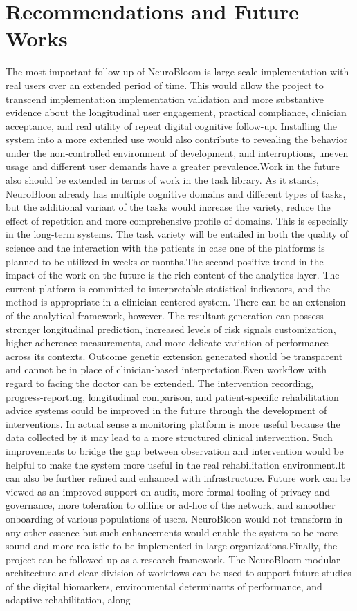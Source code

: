 \documentclass[12pt,a4paper]{report}
\begin{document}
\section{Recommendations and Future Works}
The most important follow up of NeuroBloom is large scale implementation with real users over an extended period of time. This would allow the project to transcend implementation implementation validation and more substantive evidence about the longitudinal user engagement, practical compliance, clinician acceptance, and real utility of repeat digital cognitive follow-up. Installing the system into a more extended use would also contribute to revealing the behavior under the non-controlled environment of development, and interruptions, uneven usage and different user demands have a greater prevalence.Work in the future also should be extended in terms of work in the task library. As it stands, NeuroBloon already has multiple cognitive domains and different types of tasks, but the additional variant of the tasks would increase the variety, reduce the effect of repetition and more comprehensive profile of domains. This is especially in the long-term systems. The task variety will be entailed in both the quality of science and the interaction with the patients in case one of the platforms is planned to be utilized in weeks or months.The second positive trend in the impact of the work on the future is the rich content of the analytics layer. The current platform is committed to interpretable statistical indicators, and the method is appropriate in a clinician-centered system. There can be an extension of the analytical framework, however. The resultant generation can possess stronger longitudinal prediction, increased levels of risk signals customization, higher adherence measurements, and more delicate variation of performance across its contexts. Outcome genetic extension generated should be transparent and cannot be in place of clinician-based interpretation.Even workflow with regard to facing the doctor can be extended. The intervention recording, progress-reporting, longitudinal comparison, and patient-specific rehabilitation advice systems could be improved in the future through the development of interventions. In actual sense a monitoring platform is more useful because the data collected by it may lead to a more structured clinical intervention. Such improvements to bridge the gap between observation and intervention would be helpful to make the system more useful in the real rehabilitation environment.It can also be further refined and enhanced with infrastructure. Future work can be viewed as an improved support on audit, more formal tooling of privacy and governance, more toleration to offline or ad-hoc of the network, and smoother onboarding of various populations of users. NeuroBloon would not transform in any other essence but such enhancements would enable the system to be more sound and more realistic to be implemented in large organizations.Finally, the project can be followed up as a research framework. The NeuroBloom modular architecture and clear division of workflows can be used to support future studies of the digital biomarkers, environmental determinants of performance, and adaptive rehabilitation, along 
\end{document}
